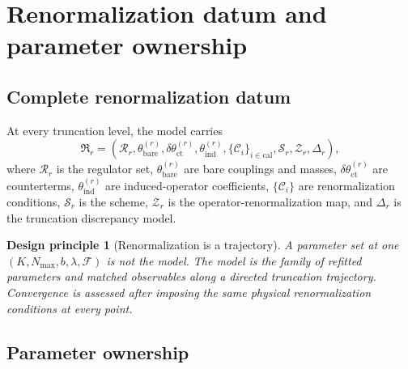 \documentclass[11pt]{article}
\newtheorem{principle}[definition]{Design principle}
\newcommand{\cR}{\mathcal R}
\newcommand{\cS}{\mathcal S}
\newcommand{\cC}{\mathcal C}
\newcommand{\cZ}{\mathcal Z}
\newcommand{\cF}{\mathcal F}
\newcommand{\bare}{\mathrm{bare}}
\newcommand{\ind}{\mathrm{ind}}
\newcommand{\ct}{\mathrm{ct}}
\newcommand{\calib}{\mathrm{cal}}
\begin{document}
\section{Renormalization datum and parameter ownership}
\label{sec:renormalization}

\subsection{Complete renormalization datum}

At every truncation level, the model carries
\begin{equation}
 \mathfrak R_r=
 \left(
 \cR_r,
 \theta_{\bare}^{(r)},
 \delta\theta_{\ct}^{(r)},
 \theta_{\ind}^{(r)},
 \{\cC_i\}_{i\in\calib},
 \cS_r,
 \cZ_r,
 \Delta_r
 \right),
 \label{eq:renormalization-datum}
\end{equation}
where \(\cR_r\) is the regulator set, \(\theta_{\bare}^{(r)}\) are bare
couplings and masses, \(\delta\theta_{\ct}^{(r)}\) are counterterms,
\(\theta_{\ind}^{(r)}\) are induced-operator coefficients,
\(\{\cC_i\}\) are renormalization conditions, \(\cS_r\) is the scheme,
\(\cZ_r\) is the operator-renormalization map, and \(\Delta_r\) is the
truncation discrepancy model.

\begin{principle}[Renormalization is a trajectory]
A parameter set at one \((K,N_{\max},b,\lambda,\cF)\) is not the model.  The
model is the family of refitted parameters and matched observables along a
directed truncation trajectory.  Convergence is assessed after imposing the
same physical renormalization conditions at every point.
\label{pr:renorm-trajectory}
\end{principle}

\subsection{Parameter ownership}
\end{document}
